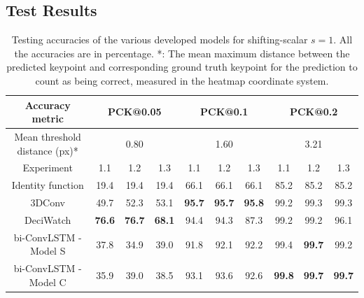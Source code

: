 \documentclass[./main.tex]{subfiles}
\begin{document}
\subsection{Test Results}
\label{subsec:finetune_test_res}
\begin{table}[htbp]
    \begin{tabular}{c||ccc|ccc|ccc}
        \hline
        Accuracy metric & \multicolumn{3}{c}{PCK@0.05} & \multicolumn{3}{c}{PCK@0.1} & \multicolumn{3}{c}{PCK@0.2} \\
        \hline
        Mean threshold distance (px)* & \multicolumn{3}{c}{0.80} & \multicolumn{3}{c}{1.60} & \multicolumn{3}{c}{3.21} \\
        \hline
        Experiment & 1.1 & 1.2 & 1.3 & 1.1 & 1.2 & 1.3 & 1.1 & 1.2 & 1.3 \\
        \hline
        \hline
        Identity function & 19.4 & 19.4 & 19.4 & 66.1 & 66.1 & 66.1 & 85.2 & 85.2 & 85.2 \\
        3DConv & 49.7 & 52.3 & 53.1 & \textbf{95.7} & \textbf{95.7} & \textbf{95.8} & 99.2 & 99.3 & 99.3 \\
        DeciWatch & \textbf{76.6} & \textbf{76.7} & \textbf{68.1} & 94.4 & 94.3 & 87.3 & 99.2 & 99.2 & 96.1 \\
        bi-ConvLSTM - Model S & 37.8 & 34.9 & 39.0 & 91.8 & 92.1 & 92.2 & 99.4 & \textbf{99.7} & 99.2 \\
        bi-ConvLSTM - Model C & 35.9 & 39.0 & 38.5 & 93.1 & 93.6 & 92.6 & \textbf{99.8} & \textbf{99.7} & \textbf{99.7} \\
        \hline
    \end{tabular}
    \caption{Testing accuracies of the various developed models for shifting-scalar $s = 1$. All the accuracies are in percentage. *: The mean maximum distance between the predicted keypoint and corresponding ground truth keypoint for the prediction to count as being correct, measured in the heatmap coordinate system.}
    \label{tab:finetune_test_accs_1}
\end{table}
\end{document}
